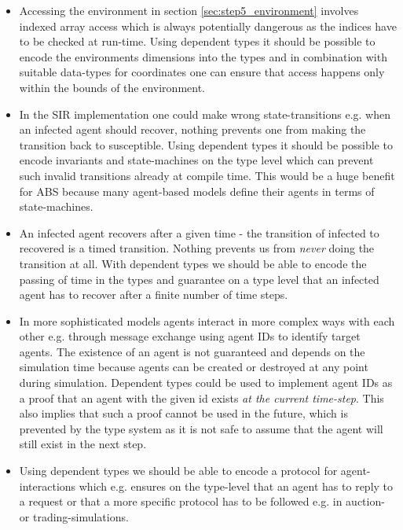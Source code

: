 \begin{itemize}
	\item Accessing the environment in section \ref{sec:step5_environment} involves indexed array access which is always potentially dangerous as the indices have to be checked at run-time. Using dependent types it should be possible to encode the environments dimensions into the types and in combination with suitable data-types for coordinates one can ensure that access happens only within the bounds of the environment.
	\item In the SIR implementation one could make wrong state-transitions e.g. when an infected agent should recover, nothing prevents one from making the transition back to susceptible. Using dependent types it should be possible to encode invariants and state-machines on the type level which can prevent such invalid transitions already at compile time. This would be a huge benefit for ABS because many agent-based models define their agents in terms of state-machines.
	\item An infected agent recovers after a given time - the transition of infected to recovered is a timed transition. Nothing prevents us from \textit{never} doing the transition at all. With dependent types we should be able to encode the passing of time in the types and guarantee on a type level that an infected agent has to recover after a finite number of time steps.
	\item In more sophisticated models agents interact in more complex ways with each other e.g. through message exchange using agent IDs to identify target agents. The existence of an agent is not guaranteed and depends on the simulation time because agents can be created or destroyed at any point during simulation. Dependent types could be used to implement agent IDs as a proof that an agent with the given id exists \textit{at the current time-step}. This also implies that such a proof cannot be used in the future, which is prevented by the type system as it is not safe to assume that the agent will still exist in the next step.
	\item Using dependent types we should be able to encode a protocol for agent-interactions which e.g. ensures on the type-level that an agent has to reply to a request or that a more specific protocol has to be followed e.g. in auction- or trading-simulations.

\end{itemize}
